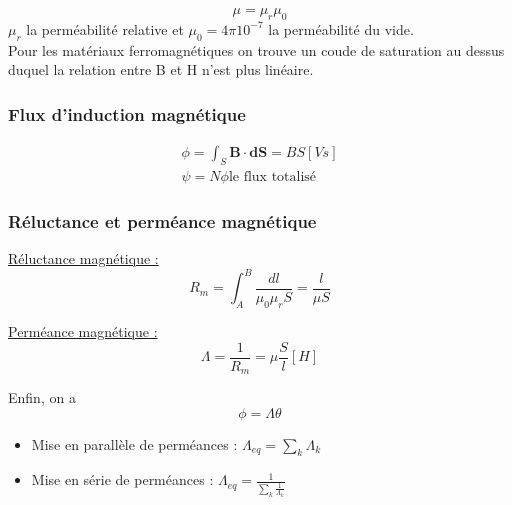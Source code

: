 \documentclass[../main.tex]{subfiles}
\begin{document}
\begin{equation}
    \mu = \mu_r \mu_0
\end{equation}
$\mu_r$ la perméabilité relative et $\mu_0 = 4\pi 10^{-7}$ la perméabilité du vide.\\

\warning Pour les matériaux ferromagnétiques on trouve un coude de saturation au dessus duquel la relation entre B et H n'est plus linéaire.\\

\subsubsection{Flux d'induction magnétique}
\begin{equation}
\begin{split}
    \phi = \int_S \mathbf{B\cdot dS} = BS [Vs]\\
    \psi = N \phi \text{le flux totalisé}
    \end{split}
\end{equation}

\subsubsection{Réluctance et perméance magnétique}
\underline{Réluctance magnétique :}\begin{equation}
    R_m = \int_A^B \frac{dl}{\mu_0\mu_r S} = \frac{l}{\mu S}
\end{equation}

\underline{Perméance magnétique :}\begin{equation}
    \Lambda = \frac{1}{R_m} = \mu \frac{S}{l} [H]
\end{equation}

Enfin, on a \begin{equation}
    \phi = \Lambda \theta
\end{equation}

\begin{itemize}
    \item Mise en parallèle de perméances : $\Lambda_{eq} = \sum_k \Lambda_k$\\
    \item Mise en série de perméances : $\Lambda_{eq} = \frac{1}{\sum_k \frac{1}{\Lambda_k}}$\\
\end{itemize}
\end{document}
